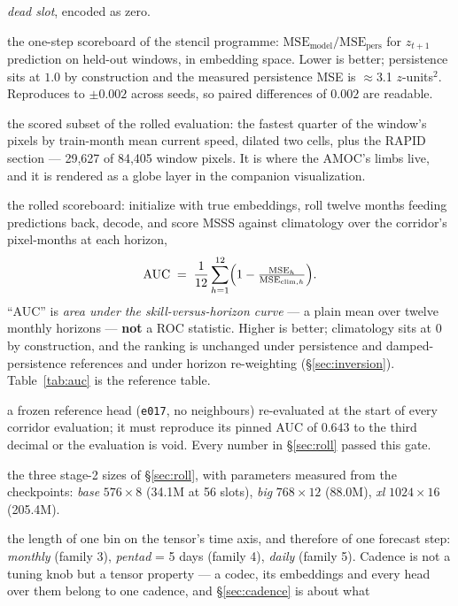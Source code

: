\documentclass[10pt]{article}
\begin{document}
\begin{description}
  \emph{dead slot}, encoded as zero.
\item[Forecast ratio] the one-step scoreboard of the stencil programme:
  $\mathrm{MSE}_{\mathrm{model}}/\mathrm{MSE}_{\mathrm{pers}}$ for
  $z_{t+1}$ prediction on held-out windows, in embedding space. Lower is
  better; persistence sits at $1.0$ by construction and the measured
  persistence MSE is $\approx$3.1 $z$-units$^2$. Reproduces to
  $\pm0.002$ across seeds, so paired differences of $0.002$ are readable.
\item[Corridor] the scored subset of the rolled evaluation: the fastest
  quarter of the window's pixels by train-month mean current speed,
  dilated two cells, plus the RAPID section --- 29{,}627 of 84{,}405
  window pixels. It is where the AMOC's limbs live, and it is rendered
  as a globe layer in the companion visualization.
\item[Corridor AUC] the rolled scoreboard: initialize with true
  embeddings, roll twelve months feeding predictions back, decode, and
  score MSSS against climatology over the corridor's pixel-months at
  each horizon,
  \[
    \mathrm{AUC} \;=\; \frac{1}{12}\sum_{h=1}^{12}
    \Bigl(1-\tfrac{\mathrm{MSE}_h}{\mathrm{MSE}_{\mathrm{clim},h}}\Bigr).
  \]
  ``AUC'' is \emph{area under the skill-versus-horizon curve} --- a
  plain mean over twelve monthly horizons --- \textbf{not} a ROC
  statistic. Higher is better; climatology sits at $0$ by construction,
  and the ranking is unchanged under persistence and damped-persistence
  references and under horizon re-weighting (\S\ref{sec:inversion}).
  Table~\ref{tab:auc} is the reference table.
\item[Gate head] a frozen reference head (\texttt{e017}, no neighbours)
  re-evaluated at the start of every corridor evaluation; it must
  reproduce its pinned AUC of $0.643$ to the third decimal or the
  evaluation is void. Every number in \S\ref{sec:roll} passed this gate.
\item[Capacity tiers] the three stage-2 sizes of \S\ref{sec:roll}, with
  parameters measured from the checkpoints: \emph{base} $576\times8$
  (34.1M at 56 slots), \emph{big} $768\times12$ (88.0M), \emph{xl}
  $1024\times16$ (205.4M).
\item[Cadence] the length of one bin on the tensor's time axis, and
  therefore of one forecast step: \emph{monthly} (family 3), \emph{pentad}
  = 5 days (family 4), \emph{daily} (family 5). Cadence is not a tuning
  knob but a tensor property --- a codec, its embeddings and every head
  over them belong to one cadence, and \S\ref{sec:cadence} is about what

\end{description}
\end{document}
